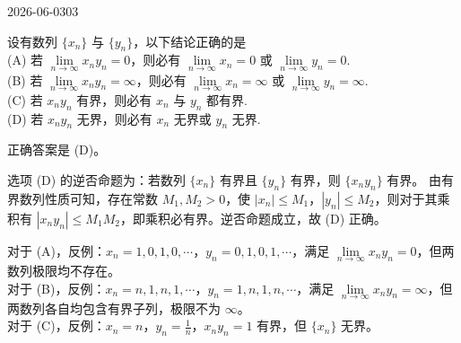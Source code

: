 \begin{mistake}{2026-06-03}{03}

\begin{problemcontent}
设有数列 \( \{x_n\} \) 与 \( \{y_n\} \)，以下结论正确的是\\
(A) 若 \( \lim\limits_{n \to \infty} x_n y_n = 0 \)，则必有 \( \lim\limits_{n \to \infty} x_n = 0 \) 或 \( \lim\limits_{n \to \infty} y_n = 0 \).\\
(B) 若 \( \lim\limits_{n \to \infty} x_n y_n = \infty \)，则必有 \( \lim\limits_{n \to \infty} x_n = \infty \) 或 \( \lim\limits_{n \to \infty} y_n = \infty \).\\
(C) 若 \( x_n y_n \) 有界，则必有 \( x_n \) 与 \( y_n \) 都有界.\\
(D) 若 \( x_n y_n \) 无界，则必有 \( x_n \) 无界或 \( y_n \) 无界.
\end{problemcontent}

\begin{solutioncontent}
正确答案是 (D)。

选项 (D) 的逆否命题为：若数列 \( \{x_n\} \) 有界且 \( \{y_n\} \) 有界，则 \( \{x_n y_n\} \) 有界。
由有界数列性质可知，存在常数 \( M_1, M_2 > 0 \)，使 \( |x_n| \le M_1 \)，\( |y_n| \le M_2 \)，则对于其乘积有 \( |x_n y_n| \le M_1 M_2 \)，即乘积必有界。逆否命题成立，故 (D) 正确。

对于 (A)，反例：\( x_n = 1, 0, 1, 0, \cdots \)，\( y_n = 0, 1, 0, 1, \cdots \)，满足 \( \lim\limits_{n \to \infty} x_n y_n = 0 \)，但两数列极限均不存在。\\
对于 (B)，反例：\( x_n = n, 1, n, 1, \cdots \)，\( y_n = 1, n, 1, n, \cdots \)，满足 \( \lim\limits_{n \to \infty} x_n y_n = \infty \)，但两数列各自均包含有界子列，极限不为 \( \infty \)。\\
对于 (C)，反例：\( x_n = n \)，\( y_n = \frac{1}{n} \)，\( x_n y_n = 1 \) 有界，但 \( \{x_n\} \) 无界。
\end{solutioncontent}


\end{mistake}
